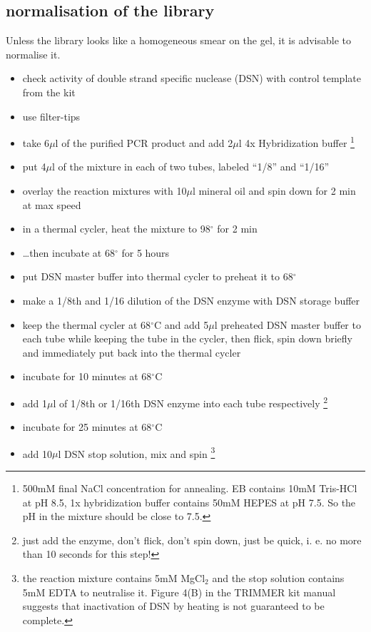 \subsection
{normalisation of the library}
Unless the library looks like a homogeneous smear on the gel, it is advisable to normalise it.
\begin{itemize}
\item check activity of double strand specific nuclease (DSN) with control template from the kit
\item {\color{red}use filter-tips}
\item take 6$\mu$l of the purified PCR product and add 2$\mu$l 4x Hybridization buffer \footnote{500mM final NaCl concentration for annealing. EB contains 10mM Tris-HCl at pH 8.5, 1x hybridization buffer contains 50mM HEPES at pH 7.5. So the pH in the mixture should be close to 7.5.}
\item put 4$\mu$l of the mixture in each of two tubes, labeled ``1/8'' and ``1/16''
\item overlay the reaction mixtures with 10$\mu$l mineral oil and spin down for 2 min at max speed
\item in a thermal cycler, heat the mixture to 98$^{\circ}$ for 2 min
\item \ldots then incubate at 68$^{\circ}$ for 5 hours
\item put DSN master buffer into thermal cycler to preheat it to 68$^{\circ}$
\item make a 1/8th and 1/16 dilution of the DSN enzyme with DSN storage buffer
\item keep the thermal cycler at 68$^{\circ}$C and add 5$\mu$l preheated DSN master buffer to each tube while keeping the tube in the cycler, then flick, spin down briefly and immediately put back into the thermal cycler 
\item incubate for 10 minutes at 68$^{\circ}$C 
\item add 1$\mu$l of 1/8th or 1/16th DSN enzyme into each tube respectively \footnote{just add the enzyme, don't flick, don't spin down, just be quick, i. e. no more than 10 seconds for this step!}
\item incubate for 25 minutes at 68$^{\circ}$C 
\item add 10$\mu$l DSN stop solution, mix and spin \footnote{the reaction mixture contains 5mM MgCl$_{2}$ and the stop solution contains 5mM EDTA to neutralise it. Figure 4(B) in the TRIMMER kit manual suggests that inactivation of DSN by heating is not guaranteed to be complete.}
\end{itemize}

